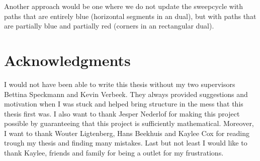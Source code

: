 Another approach would be one where we do not update the sweepcycle with paths that are entirely blue (horizontal segments in an dual), but with paths that are partially blue and partially red (corners in an rectangular dual).


\newpage
\thispagestyle{plain}
\section*{Acknowledgments}
I would not have been able to write this thesis without my two supervisors Bettina Speckmann and Kevin Verbeek. They always provided suggestions and motivation when I was stuck and helped bring structure in the mess that this thesis first was. I also want to thank Jesper Nederlof for making this project possible by guaranteeing that this project is sufficiently mathematical.
Moreover, I want to thank Wouter Ligtenberg, Hans Beekhuis and Kaylee Cox for reading trough my thesis and finding many mistakes. Last but not least I would like to thank Kaylee, friends and family for being a outlet for my frustrations.

